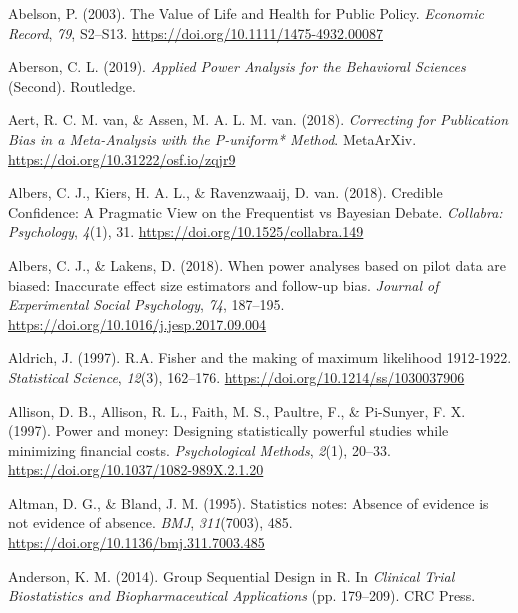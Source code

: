\documentclass[
  oneside]{krantz}
\newlength{\cslhangindent}
\newlength{\cslentryspacingunit} %
\newenvironment{CSLReferences}[2] %
 {%
  \setlength{\parindent}{0pt}
  \ifodd #1
  \let\oldpar\par
  \def\par{\hangindent=\cslhangindent\oldpar}
  \fi
  \setlength{\parskip}{#2\cslentryspacingunit}
 }%
 {}
\begin{document}
\hypertarget{refs}{}
\begin{CSLReferences}{1}{0}
\leavevmode{}%
Abelson, P. (2003). The {Value} of {Life} and {Health} for {Public
Policy}. \emph{Economic Record}, \emph{79}, S2--S13.
\url{https://doi.org/10.1111/1475-4932.00087}

\leavevmode{}%
Aberson, C. L. (2019). \emph{Applied {Power Analysis} for the
{Behavioral Sciences}} (Second). {Routledge}.

\leavevmode{}%
Aert, R. C. M. van, \& Assen, M. A. L. M. van. (2018). \emph{Correcting
for {Publication Bias} in a {Meta-Analysis} with the {P-uniform}*
{Method}}. {MetaArXiv}. \url{https://doi.org/10.31222/osf.io/zqjr9}

\leavevmode{}%
Albers, C. J., Kiers, H. A. L., \& Ravenzwaaij, D. van. (2018). Credible
{Confidence}: {A Pragmatic View} on the {Frequentist} vs {Bayesian
Debate}. \emph{Collabra: Psychology}, \emph{4}(1), 31.
\url{https://doi.org/10.1525/collabra.149}

\leavevmode{}%
Albers, C. J., \& Lakens, D. (2018). When power analyses based on pilot
data are biased: {Inaccurate} effect size estimators and follow-up bias.
\emph{Journal of Experimental Social Psychology}, \emph{74}, 187--195.
\url{https://doi.org/10.1016/j.jesp.2017.09.004}

\leavevmode{}%
Aldrich, J. (1997). R.{A}. {Fisher} and the making of maximum likelihood
1912-1922. \emph{Statistical Science}, \emph{12}(3), 162--176.
\url{https://doi.org/10.1214/ss/1030037906}

\leavevmode{}%
Allison, D. B., Allison, R. L., Faith, M. S., Paultre, F., \& Pi-Sunyer,
F. X. (1997). Power and money: {Designing} statistically powerful
studies while minimizing financial costs. \emph{Psychological Methods},
\emph{2}(1), 20--33. \url{https://doi.org/10.1037/1082-989X.2.1.20}

\leavevmode{}%
Altman, D. G., \& Bland, J. M. (1995). Statistics notes: {Absence} of
evidence is not evidence of absence. \emph{BMJ}, \emph{311}(7003), 485.
\url{https://doi.org/10.1136/bmj.311.7003.485}

\leavevmode{}%
Anderson, K. M. (2014). Group {Sequential Design} in {R}. In
\emph{Clinical {Trial Biostatistics} and {Biopharmaceutical
Applications}} (pp. 179--209). {CRC Press}.


\end{CSLReferences}
\end{document}
